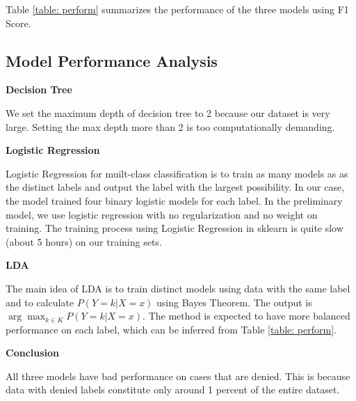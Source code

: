 \documentclass{article}
\begin{document}
\begin{multicols}{2}
Table \ref{table: perform} summarizes the performance of the three models using F1 Score.

\subsection{Model Performance Analysis} 

\hspace{1.5em}\textbf{Decision Tree}

We set the maximum depth of decision tree to 2 because our dataset is very large. Setting the max depth more than 2 is too computationally demanding.

\textbf{Logistic Regression}

Logistic Regression for muilt-class classification is to train as many models as as the distinct labels and output the label with the largest possibility. In our case, the model trained four binary logistic models for each label. In the preliminary model, we use logistic regression with no regularization and no weight on training. The training process using Logistic Regression in sklearn is quite slow (about 5 hours) on our training sets. 

\textbf{LDA}

The main idea of LDA is to train distinct models using data with the same label and to calculate $P(Y = k| X = x)$ using Bayes Theorem. The output is $\arg\max_{k \in K} P(Y = k| X = x)$. The method is expected to have more balanced performance on each label, which can be inferred from Table \ref{table: perform}. 

\textbf{Conclusion}

All three models have bad performance on cases that are denied. This is because data with denied labels constitute only around 1 percent of the entire dataset. 


\end{multicols}
\end{document}
